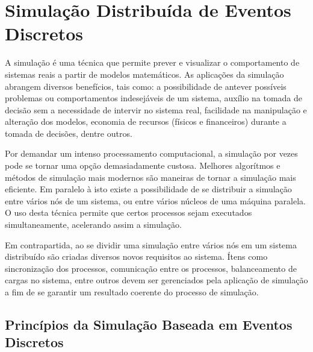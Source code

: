 \chapter{Simulação Distribuída de Eventos Discretos}


A simulação é uma técnica que permite prever e visualizar o comportamento de sistemas reais a partir de modelos matemáticos. As aplicações da simulação abrangem diversos benefícios, tais como: a possibilidade de antever possíveis problemas ou comportamentos indesejáveis de um sistema, auxílio na tomada de decisão sem a necessidade de intervir no sistema real, facilidade na manipulação e alteração dos modelos, economia de recursos (físicos e financeiros) durante a tomada de decisões, dentre outros.


Por demandar um intenso processamento computacional, a simulação por vezes pode se tornar uma opção demasiadamente custosa. Melhores algorítmos e métodos de simulação mais modernos são maneiras de tornar a simulação mais eficiente. Em paralelo à isto existe a possibilidade de se distribuir a simulação entre vários nós de um sistema, ou entre vários núcleos de uma máquina paralela. O uso desta técnica permite que certos processos sejam executados simultaneamente, acelerando assim a simulação.


Em contrapartida, ao se dividir uma simulação entre vários nós em um sistema distribuído são criadas diversos novos requisitos ao sistema. Ítens como sincronização dos processos, comunicação entre os processos, balanceamento de cargas no sistema, entre outros devem ser gerenciados pela aplicação de simulação a fim de se garantir um resultado coerente do processo de simulação.


\section{Princípios da Simulação Baseada em Eventos Discretos}

